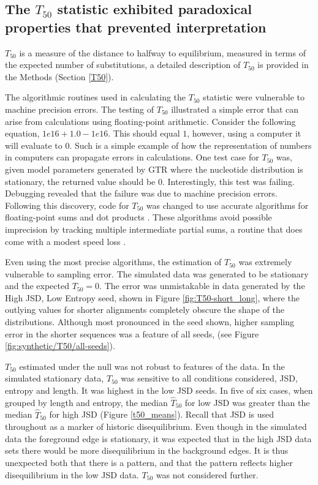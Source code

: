 

\subsection{The $T_{50}$ statistic exhibited paradoxical properties that prevented interpretation}
\label{T50_results}

$T_{50}$ is a measure of the distance to halfway to equilibrium, measured in terms of the expected number of substitutions, a detailed description of $T_{50}$ is provided in the Methods (Section \ref{T50}). 

The algorithmic routines used in calculating the $T_{50}$ statistic were vulnerable to machine precision errors. The testing of $T_{50}$ illustrated a simple error that can arise from calculations using \gls{floating-point arithmetic}. Consider the following equation, $1e16 + 1.0 - 1e16$. This should equal $1$, however, using a computer it will evaluate to $0$. Such is a simple example of how the representation of numbers in computers can propagate errors in calculations. One test case for $T_{50}$ was, given model parameters generated by GTR where the nucleotide distribution is stationary, the returned value should be $0$. Interestingly, this test was failing. Debugging revealed that the failure was due to machine precision errors. Following this discovery, code for $T_{50}$ was changed to use accurate algorithms for floating-point sums and dot products \citep{accupy}. These algorithms avoid possible imprecision by tracking multiple intermediate partial sums, a routine that does come with a modest speed loss \citep{Shewchuk1997AdaptivePredicates, Ogita2005AccurateProduct}. 

Even using the most precise algorithms, the estimation of $T_{50}$ was extremely vulnerable to sampling error. The simulated data was generated to be stationary and the expected $T_{50} = 0$. The error was unmistakable in data generated by the High JSD, Low Entropy seed, shown in Figure \ref{fig:T50-short_long}, where the outlying values for shorter alignments completely obscure the shape of the distributions. Although most pronounced in the seed shown, higher sampling error in the shorter sequences was a feature of all seeds, (see Figure \ref{fig:synthetic/T50/all-seeds}). 



$T_{50}$ estimated under the null was not robust to features of the data. In the simulated stationary data, $T_{50}$ was sensitive to all conditions considered, JSD, entropy and length. It was highest in the low JSD seeds. In five of six cases, when grouped by length and entropy, the median $\hat T_{50}$ for low JSD was greater than the median $\hat T_{50}$ for high JSD (Figure \ref{t50_means}). Recall that JSD is used throughout as a marker of historic disequilibrium. Even though in the simulated data the foreground edge is stationary, it was expected that in the high JSD data sets there would be more disequilibrium in the background edges. It is thus unexpected both that there is a pattern, and that the pattern reflects higher disequilibrium in the low JSD data. $T_{50}$ was not considered further. 

